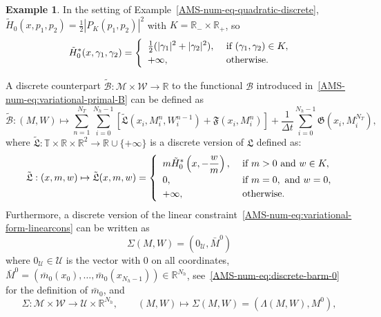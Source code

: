 \documentclass{amsproc}
\theoremstyle{definition}
\newtheorem{example}[theorem]{Example}
\theoremstyle{remark}
\numberwithin{equation}{section}
\newcommand{\RR}{{\mathbb R}}
\newcommand{\TT}{{\mathbb T}}
\newcommand{\cB}{{\mathcal B}}
\newcommand{\cM}{{\mathcal M}}
\newcommand{\cU}{{\mathcal U}}
\newcommand{\cW}{{\mathcal W}}
\begin{document}
\begin{example}\label{sec:discr-vers-vari-2}
	In the setting of Example~\ref{AMS-num-eq-quadratic-discrete}, $\tilde H_0(x, p_1, p_2) = \tfrac{1}{2} |P_K(p_1,p_2)|^2$ with $K = \RR_- \times \RR_+$, so
	$$
		\tilde H^*_0(x, \gamma_1, \gamma_2)
		=
		\begin{cases}
			\displaystyle
			\,\,  \tfrac{1}{2}(|\gamma_1|^2 + |\gamma_2|^2), &\hbox{ if } (\gamma_1,\gamma_2) \in K,
			\\
			\,\, +\infty, &\hbox{ otherwise.}
		\end{cases}
	$$
\end{example}
A discrete counterpart $\tilde\cB: \cM \times \cW \to \RR$ to the functional $\cB$ introduced in~\eqref{AMS-num-eq:variational-primal-B} can be defined as
\begin{equation}
\label{eq:var:2}  
	\tilde\cB:
	(M,W) \mapsto
	\sum_{n=1}^{N_T} \sum_{i=0}^{N_h-1} \left[ \tilde{\mathfrak{L}}(x_i, M^n_i, W^{n-1}_i) + \mathfrak{F}(x_i, M^n_i) \right] + \frac{1}{\Delta t}  \sum_{i=0}^{N_h-1}  \mathfrak{G}(x_i, M^{N_T}_i),
      \end{equation}
      where $\tilde{\mathfrak{L}}: \TT \times \RR \times \RR^2 \to \RR \cup \{+\infty\}$ is a discrete version of $\mathfrak{L}$ defined as:
\begin{equation}
\label{eq:var:3}  
	\tilde{\mathfrak{L}}:
	 (x,m,w) \mapsto \tilde{\mathfrak{L}}(x,m,w)
	 =
	\begin{cases}
		\displaystyle
		\,\, m \tilde H^*_0\left(x,-\frac{w}{m}\right), &\hbox{ if } m > 0 \hbox{ and } w \in K,
		\\
		\,\, 0, &\hbox{ if } m=0, \hbox{ and } w= 0,
		\\
		\,\, +\infty, &\hbox{ otherwise.}
	\end{cases}
      \end{equation}
      Furthermore, a discrete version of the linear constraint~\eqref{AMS-num-eq:variational-form-linearcons} can be written as
      \begin{equation}
        \label{eq:var:5}  
	\Sigma(M,W) = (0_\cU, \bar M^0)
      \end{equation}
      where $0_\cU \in \cU$ is the vector with $0$ on all coordinates, $\bar M^0 = (\bar m_0(x_0), \dots, \bar m_0(x_{N_h-1})) \in \RR^{N_h}$, see~\eqref{AMS-num-eq:discrete-barm-0} for the definition of $\bar m_0$, and 
      \begin{equation}
\label{eq:var:6}  
	\Sigma: \cM \times \cW \to \cU \times \RR^{N_h},
	\qquad
	(M,W) \mapsto \Sigma(M,W) = (\Lambda(M,W), M^0),
      \end{equation}
\end{document}
